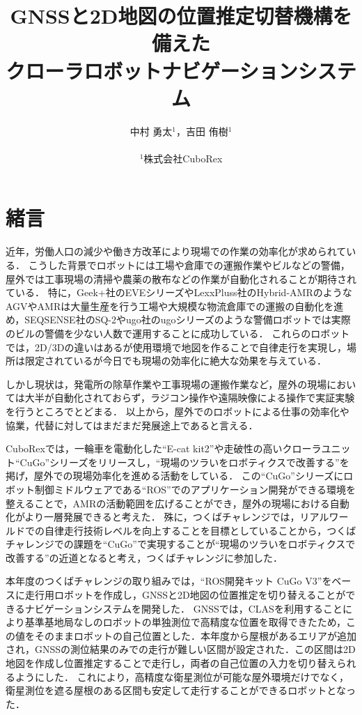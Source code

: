 \documentclass[platex,dvipdfmx]{rbproceedings}
\title{GNSSと2D地図の位置推定切替機構を備えた\\クローラロボットナビゲーションシステム}
\author{%
中村 勇太${}^{1}$，吉田 侑樹${}^{1}$\\ \\
${}^{1}$株式会社CuboRex
}
\begin{document}
\maketitle


\section{緒言}
近年，労働人口の減少や働き方改革により現場での作業の効率化が求められている．
こうした背景でロボットには工場や倉庫での運搬作業やビルなどの警備，屋外では工事現場の清掃や農薬の散布などの作業が自動化されることが期待されている．
特に，Geek+社のEVEシリーズ\cite{geek_plus}やLexxPluss社のHybrid-AMR\cite{lexxpluss}のようなAGVやAMRは大量生産を行う工場や大規模な物流倉庫での運搬の自動化を進め，SEQSENSE社のSQ-2\cite{seqsense}やugo社のugoシリーズ\cite{ugo}のような警備ロボットでは実際のビルの警備を少ない人数で運用することに成功している．
これらのロボットでは，2D/3Dの違いはあるが使用環境で地図を作ることで自律走行を実現し，場所は限定されているが今日でも現場の効率化に絶大な効果を与えている．

しかし現状は，発電所の除草作業や工事現場の運搬作業など，屋外の現場においては大半が自動化されておらず，ラジコン操作や遠隔映像による操作で実証実験を行うところでとどまる．
以上から，屋外でのロボットによる仕事の効率化や協業，代替に対してはまだまだ発展途上であると言える．

CuboRexでは，一輪車を電動化した“E-cat kit2”\cite{e_cat}や走破性の高いクローラユニット“CuGo”シリーズ\cite{cugo}をリリースし，“現場のツラいをロボティクスで改善する”を掲げ，屋外での現場効率化を進める活動をしている．
この“CuGo”シリーズにロボット制御ミドルウェアである“ROS”でのアプリケーション開発ができる環境を整えることで，AMRの活動範囲を広げることができ，屋外の現場における自動化がより一層発展できると考えた．
殊に，つくばチャレンジでは，リアルワールドでの自律走行技術レベルを向上することを目標としていることから，つくばチャレンジでの課題を“CuGo”で実現することが“現場のツラいをロボティクスで改善する”の近道となると考え，つくばチャレンジに参加した．

本年度のつくばチャレンジの取り組みでは，“ROS開発キット CuGo V3”\cite{cugo_ros}をベースに走行用ロボットを作成し，GNSSと2D地図の位置推定を切り替えることができるナビゲーションシステムを開発した．
GNSSでは，CLAS\cite{clas}を利用することにより基準基地局なしのロボットの単独測位で高精度な位置を取得できたため，この値をそのままロボットの自己位置とした．本年度から屋根があるエリアが追加され，GNSSの測位結果のみでの走行が難しい区間が設定された．この区間は2D地図を作成し位置推定することで走行し，両者の自己位置の入力を切り替えられるようにした．
これにより，高精度な衛星測位が可能な屋外環境だけでなく，衛星測位を遮る屋根のある区間も安定して走行することができるロボットとなった．
\end{document}
